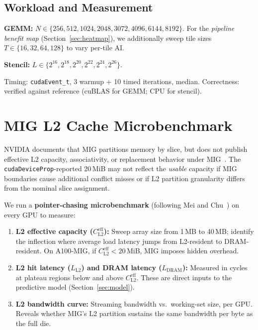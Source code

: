 \documentclass[sigplan,nonacm,10pt]{acmart}
\begin{document}
\subsection{Workload and Measurement}

\textbf{GEMM:} $N \in \{256, 512, 1024, 2048, 3072, 4096, 6144, 8192\}$.
For the \emph{pipeline benefit map} (Section~\ref{sec:heatmap}), we
additionally sweep tile sizes
$T \in \{16, 32, 64, 128\}$ to vary per-tile AI.

\textbf{Stencil:}
$L \in \{2^{16}, 2^{18}, 2^{20}, 2^{22}, 2^{24}, 2^{26}\}$.

Timing: \texttt{cudaEvent\_t}, 3 warmup + 10 timed iterations, median.
Correctness: verified against reference (cuBLAS for GEMM; CPU for stencil).

\section{MIG L2 Cache Microbenchmark}
\label{sec:mig_microbench}

NVIDIA documents that MIG partitions memory by slice, but does not
publish effective L2 capacity, associativity, or replacement behavior
under MIG~\cite{mig_guide}.
The \texttt{cudaDeviceProp}-reported 20\,MiB may not reflect the
\emph{usable} capacity if MIG boundaries cause additional conflict
misses or if L2 partition granularity differs from the nominal slice
assignment.

We run a \textbf{pointer-chasing microbenchmark}
(following Mei and Chu~\cite{mei_dissecting}) on every GPU to measure:

\begin{enumerate}
\item \textbf{L2 effective capacity ($C_{\text{L2}}^{\text{eff}}$):}
  Sweep array size from 1\,MB to 40\,MB; identify the inflection where
  average load latency jumps from L2-resident to DRAM-resident.
  On A100-MIG, if $C_{\text{L2}}^{\text{eff}} < 20$\,MiB, MIG imposes
  hidden overhead.

\item \textbf{L2 hit latency ($L_{\text{L2}}$) and DRAM latency
  ($L_{\text{DRAM}}$):}
  Measured in cycles at plateau regions below and above
  $C_{\text{L2}}^{\text{eff}}$.
  These are direct inputs to the predictive model
  (Section~\ref{sec:model}).

\item \textbf{L2 bandwidth curve:}
  Streaming bandwidth vs.\ working-set size, per GPU.
  Reveals whether MIG's L2 partition sustains the same bandwidth per
  byte as the full die.
\end{enumerate}
\end{document}
